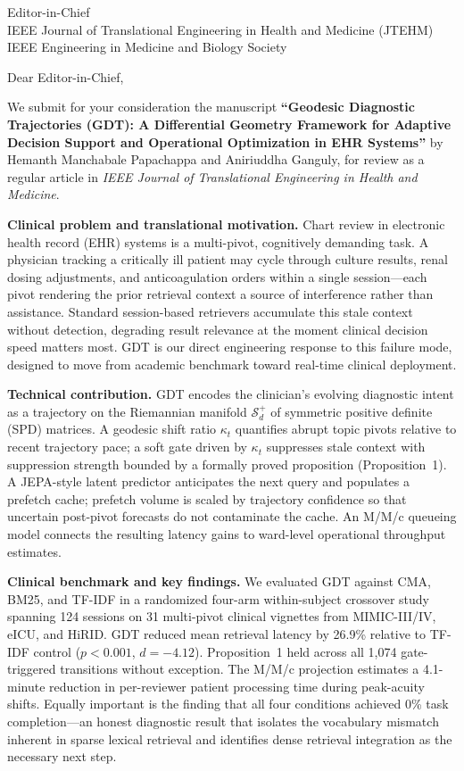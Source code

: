\documentclass[11pt]{letter}
\date{September 2026}
\begin{document}
\begin{letter}{
  Editor-in-Chief \\
  IEEE Journal of Translational Engineering in Health and Medicine (JTEHM) \\
  IEEE Engineering in Medicine and Biology Society
}

\opening{Dear Editor-in-Chief,}

We submit for your consideration the manuscript \textbf{``Geodesic Diagnostic
Trajectories (GDT): A Differential Geometry Framework for Adaptive Decision
Support and Operational Optimization in EHR Systems''} by Hemanth Manchabale
Papachappa and Aniriuddha Ganguly, for review as a regular article in
\textit{IEEE Journal of Translational Engineering in Health and Medicine}.

\textbf{Clinical problem and translational motivation.} Chart review in electronic
health record (EHR) systems is a multi-pivot, cognitively demanding task. A
physician tracking a critically ill patient may cycle through culture results,
renal dosing adjustments, and anticoagulation orders within a single session---each
pivot rendering the prior retrieval context a source of interference rather than
assistance. Standard session-based retrievers accumulate this stale context without
detection, degrading result relevance at the moment clinical decision speed matters
most. GDT is our direct engineering response to this failure mode, designed to move
from academic benchmark toward real-time clinical deployment.

\textbf{Technical contribution.} GDT encodes the clinician's evolving diagnostic
intent as a trajectory on the Riemannian manifold $\mathcal{S}_d^+$ of symmetric
positive definite (SPD) matrices. A geodesic shift ratio $\kappa_t$ quantifies
abrupt topic pivots relative to recent trajectory pace; a soft gate driven by
$\kappa_t$ suppresses stale context with suppression strength bounded by a formally
proved proposition (Proposition~1). A JEPA-style latent predictor anticipates the
next query and populates a prefetch cache; prefetch volume is scaled by trajectory
confidence so that uncertain post-pivot forecasts do not contaminate the cache.
An M/M/c queueing model connects the resulting latency gains to ward-level
operational throughput estimates.

\textbf{Clinical benchmark and key findings.} We evaluated GDT against CMA, BM25,
and TF-IDF in a randomized four-arm within-subject crossover study spanning 124
sessions on 31 multi-pivot clinical vignettes from MIMIC-III/IV, eICU, and HiRID.
GDT reduced mean retrieval latency by 26.9\% relative to TF-IDF control
($p{<}0.001$, $d{=}{-4.12}$). Proposition~1 held across all 1,074 gate-triggered
transitions without exception. The M/M/c projection estimates a 4.1-minute
reduction in per-reviewer patient processing time during peak-acuity shifts.
Equally important is the finding that all four conditions achieved 0\% task
completion---an honest diagnostic result that isolates the vocabulary mismatch
inherent in sparse lexical retrieval and identifies dense retrieval integration as
the necessary next step.


\end{letter}
\end{document}

